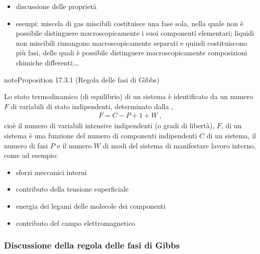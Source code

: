 \documentclass[letterpaper,10pt,italian]{jupyterBook}
\begin{document}
\sphinxAtStartPar
{}
\begin{itemize}
\item {} 
\sphinxAtStartPar
discussione delle proprietà

\item {} 
\sphinxAtStartPar
esempi: miscela di gas miscibili costituisce una fase sola, nella quale non è possibile distinguere macroscopicamente i suoi componenti elementari; liquidi non miscibili rimangono macroscopicamente separati e quindi costituiscono più fasi, delle quali è possibile distinguere macroscopicamente composizioni chimiche differenti;…

\end{itemize}
\label{ch/thermodynamics/principles-gibbs-phase-rule:proposition-4}
\begin{sphinxadmonition}{note}{Proposition 17.3.1 (Regola delle fasi di Gibbs)}



\sphinxAtStartPar
Lo stato termodinamico (di equilibrio) di un sistema è identificato da un numero \(F\) di variabili di stato  indipendenti, determinato dalla ,
\begin{equation*}
\begin{split}F = C - P + 1 + W \ ,\end{split}
\end{equation*}
\sphinxAtStartPar
cioè il numero di variabili intensive indipendenti (o gradi di libertà), \(F\), di un sistema è una funzione del numero di componenti indipendenti \(C\) di un sistema, il numero di fasi \(P\) e il numero \(W\) di modi del sistema di manifestare lavoro interno, come ad esempio:
\begin{itemize}
\item {} 
\sphinxAtStartPar
sforzi meccanici interni

\item {} 
\sphinxAtStartPar
contributo della tensione superficiale

\item {} 
\sphinxAtStartPar
energia dei legami delle molecole dei componenti

\item {} 
\sphinxAtStartPar
contributo del campo elettromagnetico

\end{itemize}
\end{sphinxadmonition}
\subsubsection*{Discussione della regola delle fasi di Gibbs}
\end{document}
